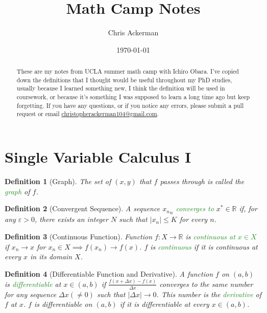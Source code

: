 \documentclass[11pt]{article}
\author{Chris Ackerman}
\date{\today}
\title{Math Camp Notes}
\newtheorem*{definition}{Definition}
\newcommand{\gr}{\textcolor{ForestGreen}}
\begin{document}
\maketitle
\begin{abstract}
These are my notes from UCLA summer math camp with Ichiro Obara. I've copied down the definitions that I thought would be useful throughout my PhD studies, usually because I learned something new, I think the definition will be used in coursework, or because it's something I was supposed to learn a long time ago but keep forgetting. If you have any questions, or if you notice any errors, please submit a  pull request or email \url{christopherackerman104@gmail.com}.
\end{abstract}

\setcounter{tocdepth}{2}
\tableofcontents

\maketitle

\newpage
\section{Single Variable Calculus I}
\label{sec:orgd534880}
\begin{definition}[Graph]
The set of $(x, y)$ that $f$ passes through is called the \gr{graph} of $f$.
\end{definition}

\begin{definition}[Convergent Sequence]
A sequence ${x_n}_n$ \gr{converges to} $x^* \in \mathbb{R}$ if, for any $\varepsilon > 0$, there exists an integer $N$ such that $|x_n| \le K$ for every $n$.
\end{definition}

\begin{definition}[Continuous Function]
Function $f: X \to \mathbb{R}$ is \gr{continuous at $x \in X$} if $x_n \to x$ for $x_n \in X \implies f(x_n) \to f(x)$. $f$ is \gr{continuous} if it is continuous at every $x$ in its domain $X$. 
\end{definition}

\begin{definition}[Differentiable Function and Derivative]
A function $f$ on $(a, b)$ is \gr{differentiable} at $x \in (a, b)$ if $\frac{f(x + \Delta x) - f(x)}{\Delta x}$ converges to the same number for any sequence $\Delta x(\ne 0)$ such that $|\Delta x| \to 0$. This number is the \gr{derivative} of $f$ at $x$. $f$ is differentiable on $(a, b)$ if it is differentiable at every $x \in (a, b)$.
\end{definition}
\end{document}

